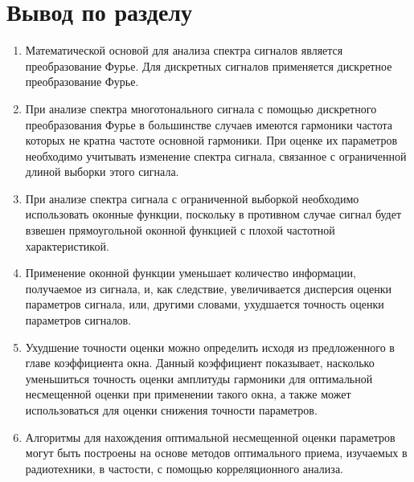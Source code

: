 \section{Вывод по разделу} \label{sec:ch2/sec6}
\begin{enumerate}
\item  Математической основой для анализа спектра сигналов является преобразование Фурье. Для дискретных сигналов применяется дискретное преобразование Фурье.

\item  При анализе спектра многотонального сигнала с помощью дискретного преобразования Фурье в большинстве случаев имеются гармоники частота которых не кратна частоте основной гармоники. При оценке их параметров необходимо учитывать изменение спектра сигнала, связанное с ограниченной длиной выборки этого сигнала.

\item  При анализе спектра сигнала с ограниченной выборкой необходимо использовать оконные функции, поскольку в противном случае сигнал будет взвешен прямоугольной оконной функцией с плохой частотной характеристикой.

\item  Применение оконной функции уменьшает количество информации, получаемое из сигнала, и, как следствие, увеличивается дисперсия оценки параметров сигнала, или, другими словами, ухудшается точность оценки параметров сигналов.

\item  Ухудшение точности оценки можно определить исходя из предложенного в главе коэффициента окна. Данный коэффициент показывает, насколько уменьшиться точность оценки амплитуды гармоники для оптимальной несмещенной оценки при применении такого окна, а также может использоваться для оценки снижения точности параметров.

\item   Алгоритмы для нахождения оптимальной несмещенной оценки параметров могут быть построены на основе методов оптимального приема, изучаемых в радиотехники, в частости, с помощью корреляционного анализа.
\end{enumerate}





